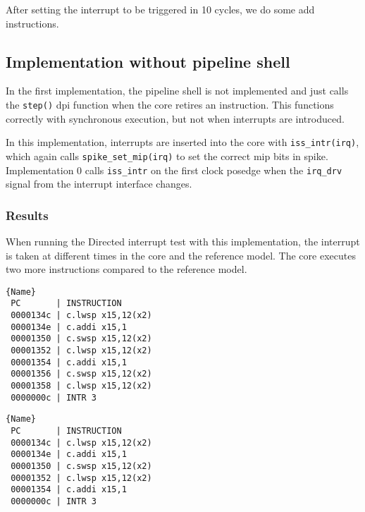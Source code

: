 After setting the interrupt to be triggered in 10 cycles, we do some add instructions.




\subsection{Implementation without pipeline shell}

In the first implementation, the pipeline shell is not implemented and just calls the \lstinline{step()} dpi function when the core retires an instruction. This functions correctly with synchronous execution, but not when interrupts are introduced. 

In this implementation, interrupts are inserted into the core with \lstinline{iss_intr(irq)}, which again calls \lstinline{spike_set_mip(irq)} to set the correct mip bits in spike. 
Implementation 0 calls \lstinline{iss_intr} on the first clock posedge when the \lstinline{irq_drv} signal from the interrupt interface changes.

\subsubsection{Results}

When running the Directed interrupt test with this implementation, the interrupt is taken at different times in the core and the reference model. The core executes two more instructions compared to the reference model. 


\begin{minipage}{.45\textwidth}
\vspace*{0pt}
\begin{lstlisting}[caption=Core,frame=tlrb]{Name}
 PC       | INSTRUCTION
 0000134c | c.lwsp x15,12(x2)
 0000134e | c.addi x15,1
 00001350 | c.swsp x15,12(x2)
 00001352 | c.lwsp x15,12(x2)
 00001354 | c.addi x15,1
 00001356 | c.swsp x15,12(x2)
 00001358 | c.lwsp x15,12(x2)
 0000000c | INTR 3
\end{lstlisting}
\end{minipage}\hfill
\begin{minipage}{.45\textwidth}
\vspace*{0pt}
\begin{lstlisting}[caption=RM,frame=tlrb]{Name}
 PC       | INSTRUCTION
 0000134c | c.lwsp x15,12(x2)
 0000134e | c.addi x15,1
 00001350 | c.swsp x15,12(x2)
 00001352 | c.lwsp x15,12(x2)
 00001354 | c.addi x15,1
 0000000c | INTR 3
\end{lstlisting}
\end{minipage}



